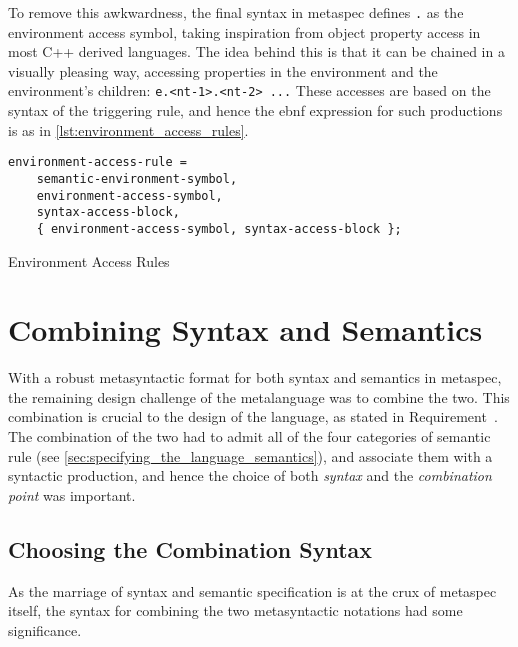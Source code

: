 To remove this awkwardness, the final syntax in \gls{metaspec} defines \texttt{.} as the environment access symbol, taking inspiration from object property access in most C++ derived languages.
The idea behind this is that it can be chained in a visually pleasing way, accessing properties in the environment and the environment's children: \texttt{e.<nt-1>.<nt-2> ...}
These accesses are based on the syntax of the triggering rule, and hence the \gls{ebnf} expression for such productions is as in \autoref{lst:environment_access_rules}.

\begin{listing}[!htb]
\begin{verbatim}
environment-access-rule = 
    semantic-environment-symbol,
    environment-access-symbol,
    syntax-access-block,
    { environment-access-symbol, syntax-access-block }; 
\end{verbatim}
\caption{Environment Access Rules}
\label{lst:environment_access_rules}
\end{listing}




\section{Combining Syntax and Semantics} %
\label{sec:combining_syntax_and_semantics}
With a robust metasyntactic format for both syntax and semantics in \gls{metaspec}, the remaining design challenge of the metalanguage was to combine the two. 
This combination is crucial to the design of the language, as stated in Requirement~.
The combination of the two had to admit all of the four categories of semantic rule (see \autoref{sec:specifying_the_language_semantics}), and associate them with a syntactic production, and hence the choice of both \textit{syntax} and the \textit{combination point} was important. 

\subsection{Choosing the Combination Syntax} %
\label{sub:choosing_the_combination_syntax}
As the marriage of syntax and semantic specification is at the crux of \gls{metaspec} itself, the syntax for combining the two metasyntactic notations had some significance. \\

